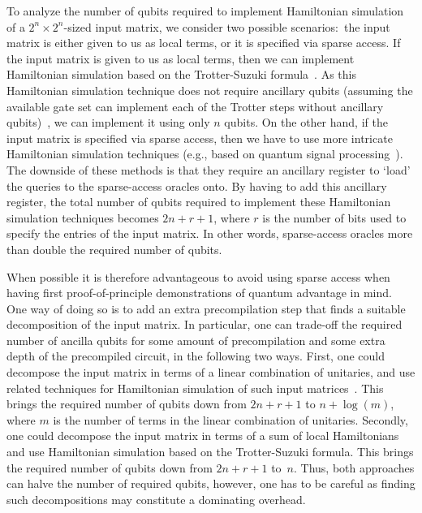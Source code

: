 \documentclass[a4paper, onecolumn, accepted=2022-08-28]{quantumarticle}
\begin{document}
To analyze the number of qubits required to implement Hamiltonian simulation of a $2^n \times 2^n$-sized input matrix, we consider two possible scenarios:\ the input matrix is either given to us as local terms, or it is specified via sparse access.
If the input matrix is given to us as local terms, then we can implement Hamiltonian simulation based on the Trotter-Suzuki formula~\cite{lloyd:hs}.
As this Hamiltonian simulation technique does not require ancillary qubits (assuming the available gate set can implement each of the Trotter steps without ancillary qubits)~\cite{cade:schatten_p}, we can implement it using only $n$ qubits.
On the other hand, if the input matrix is specified via sparse access, then we have to use more intricate Hamiltonian simulation techniques (e.g., based on quantum signal processing~\cite{low:hs}).
The downside of these methods is that they require an ancillary register to `load' the queries to the sparse-access oracles onto.
By having to add this ancillary register, the total number of qubits required to implement these Hamiltonian simulation techniques becomes $2n + r + 1$, where $r$ is the number of bits used to specify the entries of the input matrix.
In other words, sparse-access oracles more than double the required number of qubits.

When possible it is therefore advantageous to avoid using sparse access when having first proof-of-principle demonstrations of quantum advantage in mind.
One way of doing so is to add an extra precompilation step that finds a suitable decomposition of the input matrix.
In particular, one can trade-off the required number of ancilla qubits for some amount of precompilation and some extra depth of the precompiled circuit, in the following two ways.
First, one could decompose the input matrix in terms of a linear combination of unitaries, and use related techniques for Hamiltonian simulation of such input matrices~\cite{berry:hs}.
This brings the required number of qubits down from $2n + r + 1$ to $n + \log(m)$, where $m$ is the number of terms in the linear combination of unitaries.
Secondly, one could decompose the input matrix in terms of a sum of local Hamiltonians and use Hamiltonian simulation based on the Trotter-Suzuki formula.
This brings the required number of qubits down from $2n + r + 1$ to~$n$.
Thus, both approaches can halve the number of required qubits,
however, one has to be careful as finding such decompositions may constitute a dominating overhead.
\end{document}
